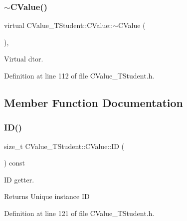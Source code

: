 \subsubsection{\texorpdfstring{$\sim$\+C\+Value()}{~CValue()}}
{\footnotesize\ttfamily virtual C\+Value\+\_\+\+T\+Student\+::\+C\+Value\+::$\sim$\+C\+Value (\begin{DoxyParamCaption}{ }\end{DoxyParamCaption})\hspace{0.3cm}{\ttfamily [inline]}, {\ttfamily [virtual]}}



Virtual d\textquotesingle{}tor. 



Definition at line 112 of file C\+Value\+\_\+\+T\+Student.\+h.



\subsection{Member Function Documentation}
\mbox{\label{class_c_value___t_student_1_1_c_value_a1566b665478e871559c8258c95903756}} 
\subsubsection{\texorpdfstring{I\+D()}{ID()}}
{\footnotesize\ttfamily size\+\_\+t C\+Value\+\_\+\+T\+Student\+::\+C\+Value\+::\+ID (\begin{DoxyParamCaption}{ }\end{DoxyParamCaption}) const\hspace{0.3cm}{\ttfamily [inline]}}



ID getter. 

\begin{DoxyReturn}{Returns}
Unique instance ID 
\end{DoxyReturn}


Definition at line 121 of file C\+Value\+\_\+\+T\+Student.\+h.

\mbox{\label{class_c_value___t_student_1_1_c_value_a8c4c7ec16e82c22d526efe356a043361}} 
